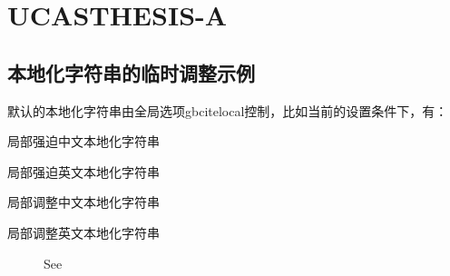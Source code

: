 \documentclass[twoside]{article}
\begin{document}
    \section*{UCASTHESIS-A}
\setcounter{section}{1}
\subsection{本地化字符串的临时调整示例}

默认的本地化字符串由全局选项gbcitelocal控制，比如当前的设置条件下，有：
    {
    \cite{chu2004tushu}
    \cite{chen1980zhongguo}
    \cite{walls2013drought}
    \cite{betts2005aging}
    }


%

    局部强迫中文本地化字符串
    {
    \cite{chu2004tushu}
    \cite{chen1980zhongguo}
    \cite{walls2013drought}
    \cite{betts2005aging}
    }

    局部强迫英文本地化字符串
    {
    \cite{chu2004tushu}
    \cite{chen1980zhongguo}
    \cite{walls2013drought}
    \cite{betts2005aging}}


    局部调整中文本地化字符串
    {%
    \makeatletter{}\makeatother
    \cite{chu2004tushu}
    \cite{chen1980zhongguo}
    \cite{walls2013drought}
    \cite{betts2005aging}}


    局部调整英文本地化字符串
    {%
    \makeatletter{}\makeatother
    \cite{chu2004tushu}
    \cite{chen1980zhongguo}
    \cite{walls2013drought}
    \cite{betts2005aging}}


\begin{figure}[!htbp]
  \centering
    {See{\makeatletter{}\makeatother\cite{walls2013drought}
    \cite{betts2005aging}}}\label{fig:bi:lang}
\end{figure}
\end{document}
